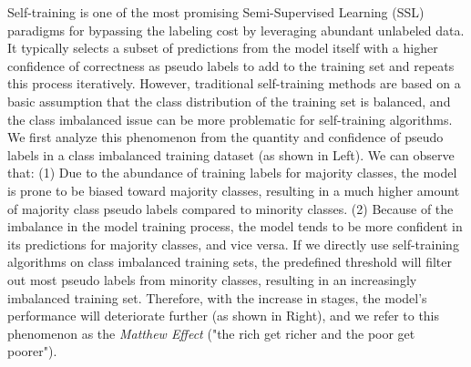 Self-training is one of the most promising Semi-Supervised Learning (SSL) paradigms for bypassing the labeling cost by leveraging abundant unlabeled data. It typically selects a subset of predictions from the model itself with a higher confidence of correctness as pseudo labels to add to the training set and repeats this process iteratively. However, traditional self-training methods are based on a basic assumption that the class distribution of the training set is balanced, and the class imbalanced issue can be more problematic for self-training algorithms. We first analyze this phenomenon from the quantity and confidence of pseudo labels in a class imbalanced training dataset (as shown in  Left). We can observe that: (1) Due to the abundance of training labels for majority classes, the model is prone to be biased toward majority classes, resulting in a much higher amount of majority class pseudo labels compared to minority classes. (2) Because of the imbalance in the model training process, the model tends to be more confident in its predictions for majority classes, and vice versa. If we directly use self-training algorithms on class imbalanced training sets, the predefined threshold will filter out most pseudo labels from minority classes, resulting in an increasingly imbalanced training set. Therefore, with the increase in stages, the model's performance will deteriorate further (as shown in  Right), and we refer to this phenomenon as the \emph{Matthew Effect} ("the rich get richer and the poor get poorer").

